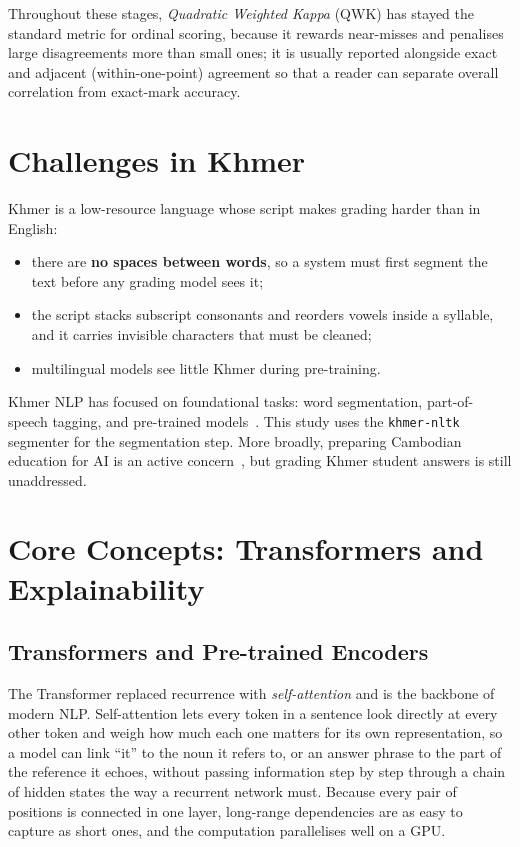 Throughout these stages, \emph{Quadratic Weighted Kappa} (QWK) has stayed the standard metric for
ordinal scoring, because it rewards near-misses and penalises large disagreements more than small ones;
it is usually reported alongside exact and adjacent (within-one-point) agreement so that a reader can
separate overall correlation from exact-mark accuracy.

\section{Challenges in Khmer}
\label{sec:lit-khmer}
Khmer is a low-resource language whose script makes grading harder than in English:

\begin{itemize}[leftmargin=1.4em]
  \item there are \textbf{no spaces between words}, so a system must first segment the text before any
  grading model sees it;
  \item the script stacks subscript consonants and reorders vowels inside a syllable, and it carries
  invisible characters that must be cleaned;
  \item multilingual models see little Khmer during pre-training.
\end{itemize}

Khmer NLP has focused on foundational tasks: word segmentation, part-of-speech tagging, and
pre-trained models~\citep{buoy2022khmer,khmernltk2020}. This study uses the \texttt{khmer-nltk}
segmenter for the segmentation step. More broadly, preparing Cambodian education for AI is an active
concern~\citep{huot2025cambodia}, but grading Khmer student answers is still unaddressed.

\section{Core Concepts: Transformers and Explainability}
\label{sec:lit-core}

\subsection{Transformers and Pre-trained Encoders}
The Transformer replaced recurrence with \emph{self-attention} and is the backbone of modern NLP.
Self-attention lets every token in a sentence look directly at every other token and weigh how much
each one matters for its own representation, so a model can link ``it'' to the noun it refers to, or an
answer phrase to the part of the reference it echoes, without passing information step by step through a
chain of hidden states the way a recurrent network must. Because every pair of positions is connected in
one layer, long-range dependencies are as easy to capture as short ones, and the computation
parallelises well on a GPU.


